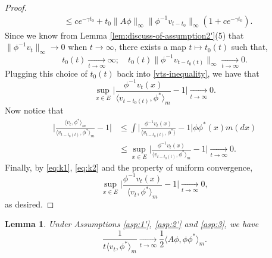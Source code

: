 \documentclass[UTF8]{pkuthss}
\theoremstyle{plain}
\newtheorem{lem}[thm]{Lemma}
\theoremstyle{definition}
\numberwithin{equation}{section}
\begin{document}
\begin{proof}
\begin{align}
	&\leq ce^{-\gamma t_0} +t_0\| A\phi\|_\infty \| \phi^{-1}v_{t-t_0}\|_\infty (1+ce^{-\gamma t_0}).
\end{align}
	Since we know from
	Lemma \ref{lem:discuss-of-assumption2'}(5)
	that $\| \phi^{-1}v_t\|_\infty\to 0$ when $t\to\infty$, there exists a map $t\mapsto t_0(t)$ such that,
\[
	t_0(t)
	\xrightarrow[t\to\infty]{} \infty;
	\quad t_0(t)\| \phi^{-1}v_{t-t_0(t)}\|_\infty
	\xrightarrow[t\to\infty]{} 0.
\]
	Plugging this choice of $t_0(t)$ back into \eqref{vts-inequality}, we have that
\begin{equation}\label{eq:k1}
	\sup_{x\in E}\Big|\frac{\phi^{-1}v_t(x)}{\langle v_{t-t_0(t)},\phi^* \rangle_m}-1 \Big|
	\xrightarrow[t\to\infty]{} 0.
\end{equation}
	Now notice that
\begin{align}\label{eq:k2}
	\Big |\frac {\langle v_t, \phi^*\rangle_m} {\langle v_{t-t_0(t)} , \phi^*\rangle_m} - 1 \Big |
	&\leq \int \Big | \frac{\phi^{-1}v_t(x)}{\langle v_{t-t_0(t)} , \phi^*\rangle} - 1 \Big| \phi \phi^*(x) m(dx)\\
	&\leq \sup_{x\in E}\Big|\frac{\phi^{-1}v_t(x)}{\langle v_{t-t_0(t)},\phi^* \rangle_m}-1 \Big|
	\xrightarrow[t\to\infty]{} 0.
\end{align}
	Finally, by \eqref{eq:k1}, \eqref{eq:k2} and the property of uniform convergence,
\[
	\sup_{x\in E}\Big|\frac{\phi^{-1}v_t(x)}{\langle v_{t},\phi^* \rangle_m}-1 \Big|
	\xrightarrow[t\to\infty]{} 0,
\]
	as desired.
\end{proof}
\begin{lem}\label{lem:Kolmogorov-2}
	Under Assumptions \ref{asp:1'}, \ref{asp:2'} and \ref{asp:3}, we have
\[
	\frac{1}{t\langle v_t,\phi^*\rangle_m}
	\xrightarrow[t\to\infty]{} \frac{1}{2}\langle  A\phi,\phi\phi^*\rangle_m.
\]
\end{lem}
\end{document}
